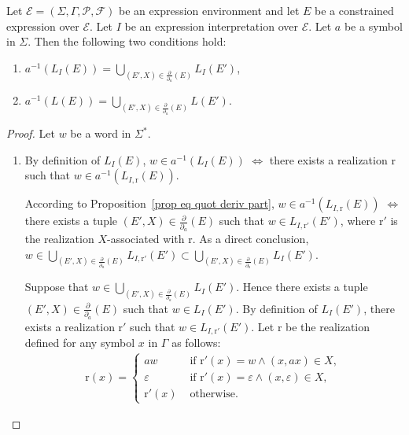 \documentclass[a4paper]{llncs}
\begin{document}
  \begin{theorem}\label{thm egal quot deriv part}
    Let $\mathcal{E}=(\Sigma,\Gamma,\mathcal{P},\mathcal{F})$ be an expression environment and let $E$ be a constrained expression over $\mathcal{E}$. Let $I$ be an expression interpretation over $\mathcal{E}$. Let $a$ be a symbol in $\Sigma$. Then the  following two conditions hold:
    \begin{enumerate}
      \item $a^{-1}(L_{I}(E))= \bigcup_{(E',X)\in\frac{\partial}{\partial_a}(E)} L_I(E')$,
      \item $a^{-1}(L(E))= \bigcup_{(E',X)\in\frac{\partial}{\partial_a}(E)} L(E')$.
    \end{enumerate}
  \end{theorem}
  \begin{proof}
    Let $w$ be a word in $\Sigma^*$. 
    \begin{enumerate}
      \item By definition of $L_{I}(E)$, $w\in a^{-1}(L_{I}(E))$ $\Leftrightarrow$ there exists a realization $\mathrm{r}$ such that $w\in a^{-1}(L_{I,\mathrm{r}}(E))$.
      
      According to Proposition~\ref{prop eq quot deriv part},      
      $w\in a^{-1}(L_{I,\mathrm{r}}(E))$ $\Leftrightarrow$ there exists a tuple $(E',X)\in\frac{\partial}{\partial_a}(E)$ such that $w \in L_{I,\mathrm{r}'}(E')$, where $\mathrm{r}'$ is the realization $X$-associated with $\mathrm{r}$. As a direct conclusion, $w\in \bigcup_{(E',X)\in\frac{\partial}{\partial_a}(E)} L_{I,\mathrm{r}'}(E')\subset \bigcup_{(E',X)\in\frac{\partial}{\partial_a}(E)} L_I(E')$.
      
      Suppose that $w\in \bigcup_{(E',X)\in\frac{\partial}{\partial_a}(E)} L_I(E')$. Hence there exists a tuple $(E',X)\in\frac{\partial}{\partial_a}(E)$ such that $w\in L_I(E')$. By definition of $ L_I(E')$, there exists a realization $\mathrm{r}'$ such that $w\in L_{I,\mathrm{r}'}(E')$. Let $\mathrm{r}$ be the realization defined for any symbol $x$ in $\Gamma$ as follows:
        \begin{align*}
        \mathrm{r}(x)=
        \begin{cases}
              aw & \text{ if } \mathrm{r}'(x)=w \wedge (x,ax)\in X,\\
              \varepsilon & \text{ if } \mathrm{r}'(x)=\varepsilon \wedge (x,\varepsilon)\in X,\\
              \mathrm{r}'(x) & \text{ otherwise.}
            \end{cases}
        \end{align*}
      

\end{enumerate}
\end{proof}
\end{document}
